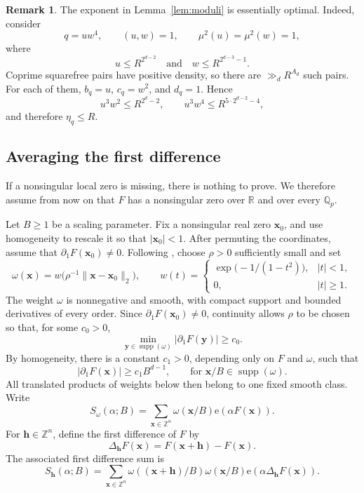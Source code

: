 \documentclass[reqno,a4paper,11pt]{amsart}
\numberwithin{equation}{section}
\newcommand{\ZZ}{\mathbb Z}
\newcommand{\QQ}{\mathbb Q}
\newcommand{\RR}{\mathbb R}
\newcommand{\x}{\mathbf{x}}
\newcommand{\h}{\mathbf h}
\newcommand{\e}{\mathrm e}
\theoremstyle{plain}
\theoremstyle{definition}
\newtheorem{remark}[theorem]{Remark}
\begin{document}
\begin{remark}
The exponent in Lemma~\ref{lem:moduli} is essentially optimal.
Indeed, consider
\[
 q=uw^4,
 \qquad
 (u,w)=1,
 \qquad
 \mu^2(u)=\mu^2(w)=1,
\]
where
\[
 u\leq R^{2^{d-2}}
 \quad\text{and}\quad
 w\leq R^{2^{d-3}-1}.
\]
Coprime squarefree pairs have positive density, so there are \(\gg_d R^{A_d}\) such pairs.
For each of them, \(b_q=u\), \(c_q=w^2\), and \(d_q=1\).
Hence
\[
 u^3w^2\leq R^{2^d-2},
 \qquad
 u^3w^4\leq R^{5\cdot2^{d-2}-4},
\]
and therefore \(\eta_q\leq R\).
\end{remark}

\subsection{Averaging the first difference}\label{sec:averaging}

If a nonsingular local zero is missing, there is nothing to prove.
We therefore assume from now on that \(F\) has a nonsingular zero over \(\RR\) and over every \(\QQ_p\).

Let \(B\geq1\) be a scaling parameter.
Fix a nonsingular real zero \(\x_0\), and use homogeneity to rescale it so that \(|\x_0|<1\).
After permuting the coordinates, assume that \(\partial_1F(\x_0)\neq0\).
Following \cite[Section~5]{bp}, choose \(\rho>0\) sufficiently small and set
\[
 \omega(\x)=w\bigl(\rho^{-1}\|\x-\x_0\|_2\bigr),
 \qquad
 w(t)=
 \begin{cases}
  \exp\bigl(-1/(1-t^2)\bigr),& |t|<1,\\
  0,& |t|\geq1.
 \end{cases}
\]
The weight \(\omega\) is nonnegative and smooth, with compact support and bounded derivatives of every order.
Since \(\partial_1F(\x_0)\neq0\), continuity allows \(\rho\) to be chosen so that, for some \(c_0>0\),
\[
 \min_{\mathbf y\in\operatorname{supp}(\omega)}
 |\partial_1F(\mathbf y)|\geq c_0.
\]
By homogeneity, there is a constant \(c_1>0\), depending only on \(F\) and \(\omega\), such that
\begin{equation}\label{eq:lower-bound-partial-F}
 |\partial_1F(\x)|\geq c_1B^{d-1},
 \qquad\text{for }\x/B\in\operatorname{supp}(\omega).
\end{equation}
All translated products of weights below then belong to one fixed smooth class.
Write
\begin{equation}\label{eq:exponential-sum}
 S_\omega(\alpha;B)=\sum_{\x\in\ZZ^n}\omega(\x/B)
 \e(\alpha F(\x)).
\end{equation}
For \(\h\in\ZZ^n\), define the first difference of \(F\) by
\begin{equation}\label{eq:first-difference}
 \Delta_\h F(\x)=F(\x+\h)-F(\x).
\end{equation}
The associated first difference sum is
\begin{equation}\label{eq:first-difference-sum}
 S_{\h}(\alpha;B)=\sum_{\x\in\ZZ^n}
 \omega((\x+\h)/B)\omega(\x/B)
 \e(\alpha\Delta_\h F(\x)).
\end{equation}
\end{document}
